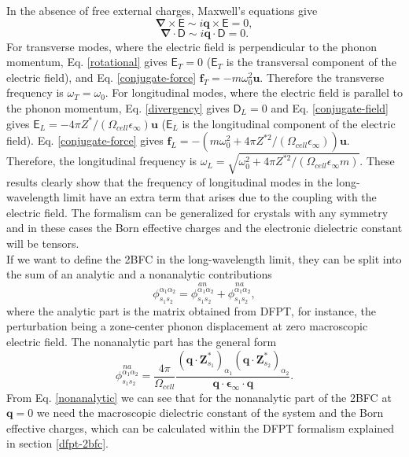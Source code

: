 In the absence of free external charges, Maxwell's equations give
\begin{equation}
 \label{rotational}
\boldsymbol{\nabla}\times\boldsymbol{\mathsf{E}}\sim i\mathbf{q}\times\boldsymbol{\mathsf{E}}=0,
\end{equation}
\begin{equation}
 \label{divergency}
\boldsymbol{\nabla}\cdot\boldsymbol{\mathsf{D}}\sim i\mathbf{q}\cdot\boldsymbol{\mathsf{D}}=0.
\end{equation}
For transverse modes, where the electric field is perpendicular to the phonon momentum, Eq. \ref{rotational} gives $\boldsymbol{\mathsf{E}}_{T}=0$ ($\boldsymbol{\mathsf{E}}_{T}$ is the transversal component of the electric 
field), and Eq. \ref{conjugate-force} $\mathbf{f}_{T}=-m\omega_{0}^{2}\mathbf{u}$. Therefore the transverse frequency is $\omega_{T}=\omega_{0}$. For longitudinal modes, where the electric field is parallel to the phonon 
momentum, Eq. \ref{divergency} gives $\boldsymbol{\mathsf{D}}_{L}=0$ and Eq. \ref{conjugate-field} gives $\boldsymbol{\mathsf{E}}_{L}=-4\pi Z^{*}/(\Omega_{cell}\epsilon_{\infty})\mathbf{u}$ ($\boldsymbol{\mathsf{E}}_{L}$ is the 
longitudinal component of the electric field). Eq. \ref{conjugate-force} gives $\mathbf{f}_{L}=-(m\omega_{0}^{2}+4\pi Z^{*2}/(\Omega_{cell}\epsilon_{\infty}))\mathbf{u}$. Therefore, the longitudinal frequency 
is $\omega_{L}=\sqrt{\omega_{0}^{2}+4\pi Z^{*2}/(\Omega_{cell}\epsilon_{\infty}m)}$. These results clearly show that the frequency of longitudinal modes in the long-wavelength limit have an extra term that arises due to the 
coupling with the electric field. The formalism can be generalized for crystals with any symmetry and in these cases the Born effective charges and the electronic dielectric constant will be tensors. \\

If we want to define the 2BFC in the long-wavelength limit, they can be split into the sum of an analytic and a nonanalytic contributions
\begin{equation}
 \phi_{s_{1}s_{2}}^{\alpha_{1}\alpha_{2}}=\overset{an}{\phi_{s_{1}s_{2}}^{\alpha_{1}\alpha_{2}}}+\overset{na}{\phi_{s_{1}s_{2}}^{\alpha_{1}\alpha_{2}}},
\end{equation}
where the analytic part is the matrix obtained from DFPT, for instance, the perturbation being a zone-center phonon displacement at zero macroscopic electric field. The nonanalytic part has the general form
\begin{equation}
\label{nonanalytic}
\overset{na}{\phi_{s_{1}s_{2}}^{\alpha_{1}\alpha_{2}}}=\frac{4\pi}{\Omega_{cell}}\frac{(\mathbf{q}\cdot\mathbf{Z}^{*}_{s_{1}})_{\alpha_{1}}(\mathbf{q}\cdot\mathbf{Z}^{*}_{s_{2}})_{\alpha_{2}}}{\mathbf{q}\cdot\boldsymbol{
\epsilon}_{\infty}\cdot\mathbf{q}}.
\end{equation}
From Eq. \ref{nonanalytic} we can see that for the nonanalytic part of the 2BFC at $\mathbf{q}=0$ we need the macroscopic dielectric constant of the system and the Born effective charges, which can be calculated within
the DFPT formalism explained in section \ref{dfpt-2bfc}\cite{gonze1997dynamical}. \\

